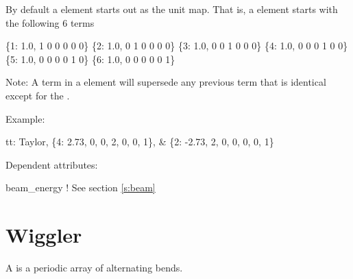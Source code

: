 By default a  element starts out as the unit map. 
That is, a  element starts with the following 6 terms
\begin{example}
  \{1: 1.0, 1 0 0 0 0 0\}
  \{2: 1.0, 0 1 0 0 0 0\}
  \{3: 1.0, 0 0 1 0 0 0\}
  \{4: 1.0, 0 0 0 1 0 0\}
  \{5: 1.0, 0 0 0 0 1 0\}
  \{6: 1.0, 0 0 0 0 0 1\}
\end{example}
Note: A term in a  element will supersede any previous term
that is identical except for 
the .

 \noindent
Example:
\begin{example}
  tt: Taylor, \{4:  2.73, 0, 0, 2, 0, 0, 1\}, &
              \{2: -2.73, 2, 0, 0, 0, 0, 1\}
\end{example}

\vskip0.05in \noindent
Dependent attributes:
\begin{example}
  beam\_energy  ! See section \ref{s:beam}
\end{example}

\section{Wiggler} 
\label{s:wig}

A  is a periodic array of alternating bends.


